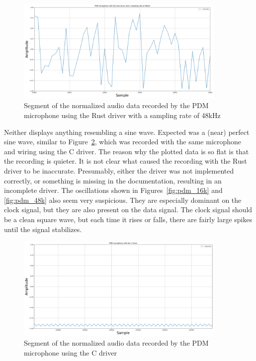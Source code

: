 \begin{figure}[H]
    \centering
    \includegraphics[width=0.9\textwidth]{figures/pdm/pdm_rust_48k.png}
    \caption[Segment of the normalized audio data recorded by the PDM microphone using the Rust driver with a sampling rate of 48kHz]
    {Segment of the normalized audio data recorded by the PDM microphone using the Rust driver with a sampling rate of 48kHz}
    \label{fig:pdm_rust_48k}
\end{figure}

Neither displays anything resembling a sine wave.
Expected was a (near) perfect sine wave, similar to Figure~\ref{fig:pdm_c},
which was recorded with the same microphone and wiring using the C driver.
The reason why the plotted data is so flat is that the recording is quieter.
It is not clear what caused the recording with the Rust driver to be inaccurate.
Presumably, either the driver was not implemented correctly, or something is missing in the documentation, resulting in an incomplete driver.
The oscillations shown in Figures~\ref{fig:pdm_16k} and \ref{fig:pdm_48k} also seem very suspicious.
They are especially dominant on the clock signal, but they are also present on the data signal.
The clock signal should be a clean square wave, but each time it rises or falls,
there are fairly large spikes until the signal stabilizes.

\begin{figure}[H]
    \centering
    \includegraphics[width=0.9\textwidth]{figures/pdm/pdm_c.png}
    \caption[Segment of the normalized audio data recorded by the PDM microphone using the C driver]{Segment of the normalized audio data recorded by the PDM microphone using the C driver}
    \label{fig:pdm_c}
\end{figure}

